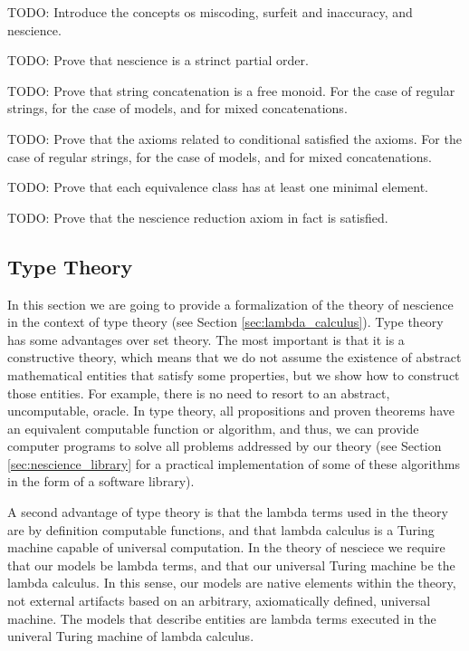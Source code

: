 {\color{red} TODO: Introduce the concepts os miscoding, surfeit and inaccuracy, and nescience.}

{\color{red} TODO: Prove that nescience is a strinct partial order.}

{\color{red} TODO: Prove that string concatenation is a free monoid. For the case of regular strings, for the case of models, and for mixed concatenations.}

{\color{red} TODO: Prove that the axioms related to conditional satisfied the axioms. For the case of regular strings, for the case of models, and for mixed concatenations.}

{\color{red} TODO: Prove that each equivalence class has at least one minimal element.}

{\color{red} TODO: Prove that the nescience reduction axiom in fact is satisfied.}

%
%

\subsection{Type Theory}

In this section we are going to provide a formalization of the theory of nescience in the context of type theory (see Section \ref{sec:lambda_calculus}). Type theory has some advantages over set theory. The most important is that it is a constructive theory, which means that we do not assume the existence of abstract mathematical entities that satisfy some properties, but we show how to construct those entities. For example, there is no need to resort to an abstract, uncomputable, oracle. In type theory, all propositions and proven theorems have an equivalent computable function or algorithm, and thus, we can provide computer programs to solve all problems addressed by our theory (see Section \ref{sec:nescience_library} for a practical implementation of some of these algorithms in the form of a software library).

A second advantage of type theory is that the lambda terms used in the theory are by definition computable functions, and that lambda calculus is a Turing machine capable of universal computation. In the theory of nesciece we require that our models be lambda terms, and that our universal Turing machine be the lambda calculus. In this sense, our models are native elements within the theory, not external artifacts based on an arbitrary, axiomatically defined, universal machine. The models that describe entities are lambda terms executed in the univeral Turing machine of lambda calculus.

